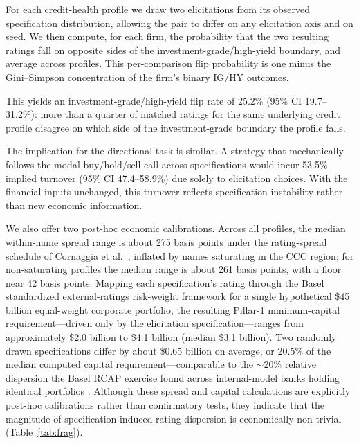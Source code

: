 \documentclass[pdflatex,sn-nature,lineno]{sn-jnl}
\theoremstyle{thmstyleone}
\begin{document}
For each credit-health profile we draw two elicitations from its observed specification distribution,
allowing the pair to differ on any elicitation axis and on seed. We then compute, for each firm, the
probability that the two resulting ratings fall on opposite sides of the investment-grade/high-yield
boundary, and average across profiles. This per-comparison flip probability is one minus the
Gini--Simpson concentration of the firm's binary IG/HY outcomes.

This yields an investment-grade/high-yield flip rate of 25.2\% (95\% CI 19.7--31.2\%): more than a
quarter of matched ratings for the same underlying credit profile disagree on which side of the
investment-grade boundary the profile falls.

The implication for the directional task is similar. A strategy that mechanically follows the modal
buy/hold/sell call across specifications would incur 53.5\% implied turnover (95\% CI 47.4--58.9\%) due
solely to elicitation choices. With the financial inputs unchanged, this turnover reflects specification
instability rather than new economic information.

We also offer two post-hoc economic calibrations. Across all profiles, the median within-name
spread range is about 275 basis points under the rating-spread schedule of Cornaggia et
al.\ \cite{cornaggia2018}, inflated by names saturating in the CCC region; for non-saturating profiles
the median range is about 261 basis points, with a floor near 42 basis points. Mapping
each specification's rating through the Basel standardized external-ratings risk-weight framework
\cite{bcbs2019cre20} for a single hypothetical \$45 billion equal-weight corporate portfolio, the
resulting Pillar-1 minimum-capital requirement---driven only by the elicitation specification---ranges
from approximately \$2.0 billion to \$4.1 billion (median \$3.1 billion). Two randomly drawn specifications differ by about
\$0.65 billion on average, or 20.5\% of the median computed capital requirement---comparable to the
$\sim$20\% relative dispersion the Basel RCAP exercise found across internal-model banks holding
identical portfolios \cite{bcbs2013rcap}. Although these spread and capital calculations are explicitly
post-hoc calibrations rather than confirmatory tests, they indicate that the magnitude of
specification-induced rating dispersion is economically non-trivial (Table~\ref{tab:frag}).
\end{document}
